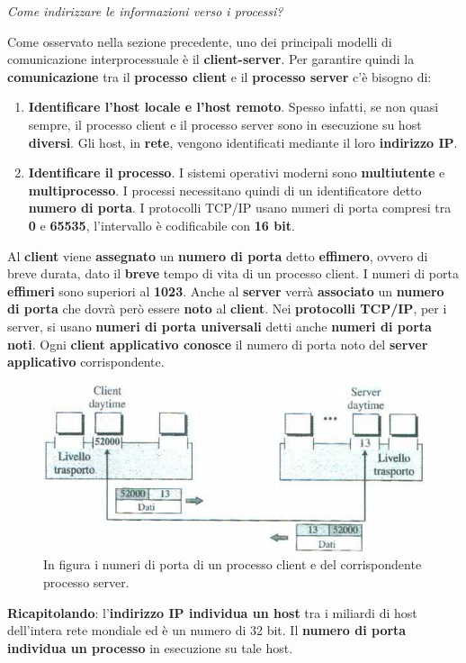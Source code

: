 \documentclass[11pt,a4paper,oneside]{book}
\theoremstyle{definition}
\begin{document}
\begin{flushleft}
	\textit{Come indirizzare le informazioni verso i processi?}
\end{flushleft}
Come osservato nella sezione precedente, uno dei principali modelli di comunicazione interprocessuale è il \textbf{client-server}. Per garantire quindi la \textbf{comunicazione} tra il \textbf{processo client} e il \textbf{processo server} c'è bisogno di:
\begin{enumerate}
	\item \textbf{Identificare l'host locale e l'host remoto}. Spesso infatti, se non quasi sempre, il processo client e il processo server sono in esecuzione su host \textbf{diversi}. Gli host, in \textbf{rete}, vengono identificati mediante il loro \textbf{indirizzo IP}.
	\item \textbf{Identificare il processo}. I sistemi operativi moderni sono \textbf{multiutente} e \textbf{multiprocesso}. I processi necessitano quindi di un  identificatore detto \textbf{numero di porta}. I protocolli TCP/IP usano numeri di porta compresi tra \textbf{0} e \textbf{65535}, l'intervallo è codificabile con \textbf{16 bit}.
\end{enumerate}
Al \textbf{client} viene \textbf{assegnato} un \textbf{numero di porta} detto \textbf{effimero}, ovvero di breve durata, dato il \textbf{breve} tempo di vita di un processo client. I numeri di porta \textbf{effimeri} sono superiori al \textbf{1023}.\newline
Anche al \textbf{server} verrà \textbf{associato} un \textbf{numero di porta} che dovrà però essere \textbf{noto} al \textbf{client}. Nei \textbf{protocolli TCP/IP},  per i server, si usano \textbf{numeri di porta universali} detti anche \textbf{numeri di porta noti}. Ogni \textbf{client applicativo conosce} il numero di porta noto del \textbf{server applicativo} corrispondente.
\begin{figure}[!h]
	\includegraphics[scale=0.65]{Immagini/Port_numb.png}
	\centering
	\caption{In figura i numeri di porta di un processo client e del corrispondente processo server.}
\end{figure}\newline
\textbf{Ricapitolando}: l'\textbf{indirizzo IP individua un host} tra i miliardi di host dell'intera rete mondiale ed è un numero di 32 bit. Il \textbf{numero di porta individua un processo} in esecuzione su tale host.
\end{document}

